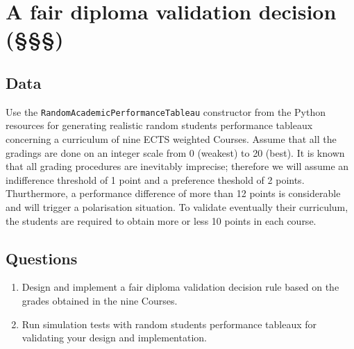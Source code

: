 \section{A fair diploma validation decision (§§§)}
\label{sec:15.5}

\subsection{Data}
\label{sec:15.5.1}

Use the \texttt{RandomAcademicPerformanceTableau} constructor from the \Digraph Python resources for generating realistic random students performance tableaux concerning a curriculum of nine ECTS weighted Courses. Assume that all the gradings are done on an integer scale from 0 (weakest) to 20 (best). It is known that all grading procedures are inevitably imprecise; therefore we will assume an indifference threshold of 1 point and a preference theshold of 2 points. Thurthermore, a performance difference of more than 12 points is considerable and will trigger a polarisation situation. To validate eventually their curriculum, the students are required to obtain more or less 10 points in each course. 

\subsection{Questions}
\label{sec:15.5.2}

\begin{enumerate}
\item Design and implement a fair diploma validation decision rule based on the grades obtained in the nine Courses.
\item Run simulation tests with random students performance tableaux for validating your design and implementation.
\end{enumerate}

